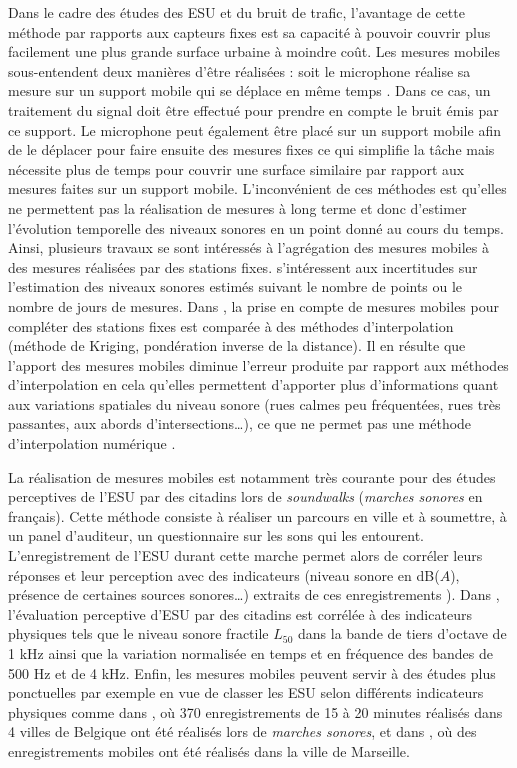 Dans le cadre des études des ESU et du bruit de trafic, l'avantage de cette méthode par rapports aux capteurs fixes est sa capacité à pouvoir couvrir plus facilement une plus grande surface urbaine à moindre coût. Les mesures mobiles sous-entendent deux manières d'être réalisées : soit le microphone réalise sa mesure sur un support mobile qui se déplace en même temps \cite{alsina-pages_design_2016}. Dans ce cas, un traitement du signal doit être effectué pour prendre en compte le bruit émis par ce support. 
Le microphone peut également être placé sur un support mobile afin de le déplacer pour faire ensuite des mesures fixes \cite{manvell2004sadmam} ce qui simplifie la tâche mais nécessite plus de temps pour couvrir une surface similaire par rapport aux mesures faites sur un support mobile. 
L'inconvénient de ces méthodes est qu'elles ne permettent pas la réalisation de mesures à long terme et donc d'estimer l'évolution temporelle des niveaux sonores en un point donné au cours du temps.
Ainsi, plusieurs travaux se sont intéressés à l'agrégation des mesures mobiles à des mesures réalisées par des stations fixes.
\cite{morillas2014uncertainty} s'intéressent aux incertitudes sur l'estimation des niveaux sonores estimés suivant le nombre de points ou le nombre de jours de mesures. Dans \cite{can_measurement_2014}, la prise en compte de mesures mobiles pour compléter des stations fixes est comparée à des méthodes d'interpolation (méthode de Kriging, pondération inverse de la distance). Il en résulte que l'apport des mesures mobiles diminue l'erreur produite par rapport aux méthodes d'interpolation en cela qu'elles permettent d'apporter plus d'informations quant aux variations spatiales du niveau sonore (rues calmes peu fréquentées, rues très passantes, aux abords d'intersections\dots), ce que ne permet pas une méthode d'interpolation numérique \cite{aumond2018kriging}.

La réalisation de mesures mobiles est notamment très courante pour des études perceptives de l'ESU par des citadins lors de \textit{soundwalks} (\textit{marches sonores} en français). Cette méthode consiste à réaliser un parcours en ville et à soumettre, à un panel d'auditeur, un questionnaire sur les sons qui les entourent. L'enregistrement de l'ESU durant cette marche permet alors de corréler leurs réponses et leur perception avec des indicateurs (niveau sonore en dB($A$), présence de certaines sources sonores\dots{}) extraits de ces enregistrements \cite{brocolini_measurements_2013, hong2013designing}). Dans \cite{aumond2017modeling}, l'évaluation perceptive d'ESU par des citadins est corrélée à des indicateurs physiques tels que le niveau sonore fractile $L_{50}$ dans la bande de tiers d'octave de 1 kHz ainsi que la variation normalisée en temps et en fréquence des bandes de 500 Hz et de 4 kHz.
Enfin, les mesures mobiles peuvent servir à des études plus ponctuelles par exemple en vue de classer les ESU selon différents indicateurs physiques comme dans \cite{rychtarikova2013soundscape}, où 370 enregistrements de 15 à 20 minutes réalisés dans 4 villes de Belgique ont été réalisés lors de \textit{marches sonores}, et dans \cite{can_describing_2015}, où des enregistrements mobiles ont été réalisés dans la ville de Marseille.


